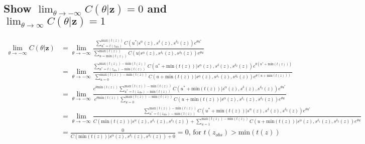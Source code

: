 \documentclass{article}
\begin{document}
\subsection{Show $\lim_{\theta \to -\infty} C(\theta|\textbf{z}) = 0$ and $\lim_{\theta \to \infty} C(\theta|\textbf{z}) = 1$}
\begin{align*}
  \lim_{\theta \to -\infty} C(\theta|\textbf{z}) 
  &= \lim_{\theta \to -\infty} \frac
  {\sum_{u^*=t(z_{obs})}^{\text{max}(t(z))} C(u^*|s^\alpha(z), s^\delta(z), s^{\delta_2}(z))e^{\theta u^*}}
  {\sum_{u=\text{min}(t(z))}^{\text{max}(t(z))} C(u|s^\alpha(z), s^{\delta_1}(z), s^{\delta_2}(z))e^{\theta u}} \\
  &= \lim_{\theta \to -\infty} \frac
  {\sum_{u^*=t(z_{obs})-\text{min}(t(z))}^{\text{max}(t(z))-\text{min}(t(z))} 
  C(u^*+\text{min}(t(z))|s^\alpha(z), s^\delta(z), s^{\delta_2}(z))e^{\theta (u^*+\text{min}(t(z)))}}
  {\sum_{u=0}^{\text{max}(t(z))-\text{min}(t(z))} 
  C(u+\text{min}(t(z))|s^\alpha(z), s^{\delta_1}(z), s^{\delta_2}(z))e^{\theta (u+\text{min}(t(z)))}} \\
  &= \lim_{\theta \to -\infty} \frac
  {e^{\theta \text{min}(t(z))} \sum_{u^*=t(z_{obs})-\text{min}(t(z))}^{\text{max}(t(z))-\text{min}(t(z))} 
  C(u^*+\text{min}(t(z))|s^\alpha(z), s^\delta(z), s^{\delta_2}(z))e^{\theta u^*}}
  {e^{\theta \text{min}(t(z))} \sum_{u=0}^{\text{max}(t(z))-\text{min}(t(z))} 
  C(u+\text{min}(t(z))|s^\alpha(z), s^{\delta_1}(z), s^{\delta_2}(z))e^{\theta u}} \\
  &= \lim_{\theta \to -\infty} \frac
  {\sum_{u^*=t(z_{obs})-\text{min}(t(z))}^{\text{max}(t(z))-\text{min}(t(z))} 
  C(u^*+\text{min}(t(z))|s^\alpha(z), s^\delta(z), s^{\delta_2}(z))e^{\theta u^*}}
  {C(\text{min}(t(z))|s^\alpha(z), s^{\delta_1}(z), s^{\delta_2}(z))+\sum_{u=1}^{\text{max}(t(z))-\text{min}(t(z))} 
  C(u+\text{min}(t(z))|s^\alpha(z), s^{\delta_1}(z), s^{\delta_2}(z))e^{\theta u}} \\
  &= \frac{0}{C(\text{min}(t(z))|s^\alpha(z), s^{\delta_1}(z), s^{\delta_2}(z))+0} = 0
  \text{, for } t(z_{obs}) > \text{min}(t(z)) \\
\end{align*}
\end{document}
